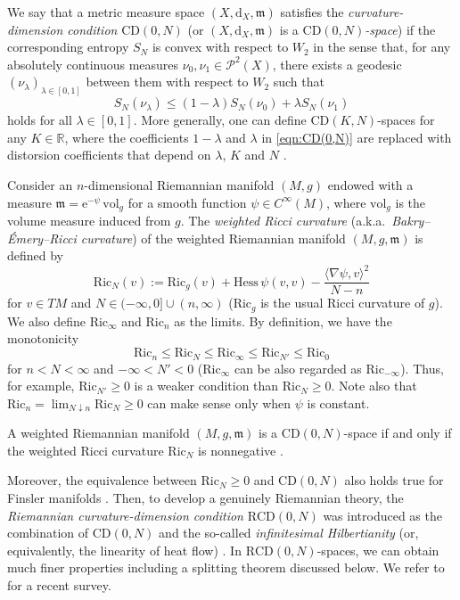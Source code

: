 \documentclass[sts]{imsart}
\theoremstyle{definition}
\theoremstyle{remark}
\newcommand{\R}{\mathbb{R}}
\newcommand{\fm}{\mathfrak{m}}
\newcommand{\dist}{\mathrm{d}}
\newcommand{\e}{\mathrm{e}}
\newcommand{\CD}{\mathrm{CD}}
\newcommand{\RCD}{\mathrm{RCD}}
\newcommand{\Ric}{\mathrm{Ric}}
\newcommand{\veb}[1]{\textcolor{blue}{\textbf{VEB:}  #1}}
\begin{document}
We say that a metric measure space $(X,\dist_X,\fm)$ satisfies the \emph{curvature-dimension condition} $\CD(0,N)$ (or $(X,\dist_X,\fm)$ is a \emph{$\CD(0,N)$-space}) if the corresponding entropy $S_N$ is convex with respect to $W_2$ in the sense that,
for any absolutely continuous measures $\nu_0,\nu_1 \in \mathcal{P}^2(X)$, there exists a geodesic $(\nu_\lambda)_{\lambda \in [0,1]}$ between them with respect to $W_2$ such that
\begin{equation}\label{eqn:CD(0,N)}
S_N(\nu_\lambda) \le (1-\lambda)S_N(\nu_0) +\lambda S_N(\nu_1)
\end{equation}
holds for all $\lambda \in [0,1]$.
More generally, one can define $\CD(K,N)$-spaces for any $K\in \R$, where the coefficients $1-\lambda$ and $\lambda$ in \eqref{eqn:CD(0,N)} are replaced with distorsion coefficients that depend on $\lambda$, $K$ and $N$ \cite{SturmII}.

Consider an $n$-dimensional Riemannian manifold $(M,g)$ endowed with a measure $\fm=\e^{-\psi}\,\mathrm{vol}_g$ for a smooth function $\psi \in C^{\infty}(M)$, where $\mathrm{vol}_g$ is the volume measure induced from $g$.
The \emph{weighted Ricci curvature} (a.k.a.\ \emph{Bakry--\'Emery--Ricci curvature}) of the weighted Riemannian manifold $(M,g,\fm)$ is defined by
\begin{equation}\label{eq:Ric_N}
\Ric_N(v) :=\Ric_g(v) +\mathrm{Hess}\,\psi(v,v) -\frac{\langle \nabla \psi,v \rangle^2}{N-n}
\end{equation}
for $v \in TM$ and $N \in (-\infty,0] \cup (n,\infty)$ ($\Ric_g$ is the usual Ricci curvature of $g$).
We also define $\Ric_\infty$ and $\Ric_n$ as the limits. %
By definition, we have the monotonicity
\begin{equation}\label{eq:mono}
\Ric_n \le \Ric_N \le \Ric_{\infty} \le \Ric_{N'} \le \Ric_0
\end{equation}
for $n<N<\infty$ and $-\infty<N'<0$ ($\Ric_\infty$ can be also regarded as $\Ric_{-\infty}$).
Thus, for example, $\Ric_{N'} \ge 0$ is a weaker condition than $\Ric_N \ge 0$.
Note also that $\Ric_n=\lim_{N \downarrow n}\Ric_N \ge 0$ can make sense only when $\psi$ is constant.

A weighted Riemannian manifold $(M,g,\fm)$ is a $\CD(0,N)$-space if and only if the weighted Ricci curvature $\Ric_N$ is nonnegative \cite{CMS01,CMS06,LottVillani,Oneg,Oneedle,vRS,SturmI,SturmII}.

Moreover, the equivalence between $\Ric_N \ge 0$ and $\CD(0,N)$ also holds true for Finsler manifolds \cite{Oint}.
Then, to develop a genuinely Riemannian theory, the \emph{Riemannian curvature-dimension condition} $\RCD(0,N)$ was introduced as the combination of $\CD(0,N)$ and the so-called \emph{infinitesimal Hilbertianity} (or, equivalently, the linearity of heat flow) \cite{AGS,EKS,gsplit}.
In $\RCD(0,N)$-spaces, we can obtain much finer properties including a splitting theorem discussed below.
We refer to \cite{Sturm24} for a recent survey.
\end{document}
